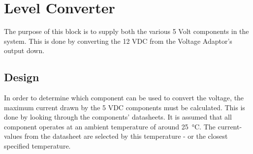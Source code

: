 \newpage
\section{Level Converter}
The purpose of this block is to supply both the various 5 Volt components in the system. This is done by converting the 12 VDC from the Voltage Adaptor's output down.

\subsection{Design} 
In order to determine which component can be used to convert the voltage, the maximum current drawn by the 5 VDC components must be calculated. This is done by looking through the components' datasheets. It is assumed that all component operates at an ambient temperature of around \SI{25}{\celsius}. The current-values from the datasheet are selected by this temperature - or the closest specified temperature.
